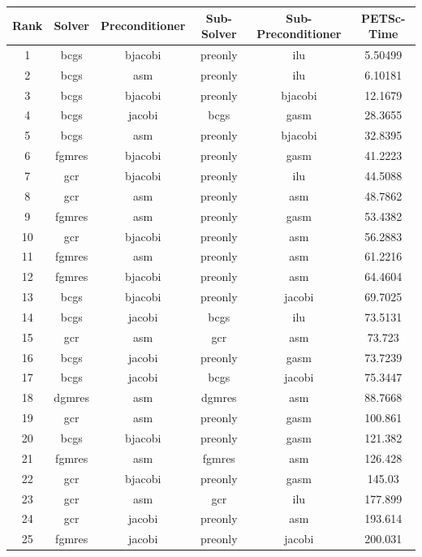 \begin{table}[h]
  \tiny
  \centering
  \begin{tabular}{cccccc}
    \hline Rank & Solver & Preconditioner & Sub-Solver & Sub-Preconditioner & PETSc-Time\\ \hline

    1 & bcgs & bjacobi & preonly & ilu & 5.50499 \\
    2 & bcgs & asm & preonly & ilu & 6.10181 \\
    3 & bcgs & bjacobi & preonly & bjacobi & 12.1679 \\
    4 & bcgs & jacobi & bcgs & gasm & 28.3655 \\
    5 & bcgs & asm & preonly & bjacobi & 32.8395 \\
    6 & fgmres & bjacobi & preonly & gasm & 41.2223 \\
    7 & gcr & bjacobi & preonly & ilu & 44.5088 \\
    8 & gcr & asm & preonly & asm & 48.7862 \\
    9 & fgmres & asm & preonly & gasm & 53.4382 \\
    10 & gcr & bjacobi & preonly & asm & 56.2883 \\
    11 & fgmres & asm & preonly & asm & 61.2216 \\
    12 & fgmres & bjacobi & preonly & asm & 64.4604 \\
    13 & bcgs & bjacobi & preonly & jacobi & 69.7025 \\
    14 & bcgs & jacobi & bcgs & ilu & 73.5131 \\
    15 & gcr & asm & gcr & asm & 73.723 \\
    16 & bcgs & jacobi & preonly & gasm & 73.7239 \\
    17 & bcgs & jacobi & bcgs & jacobi & 75.3447 \\
    18 & dgmres & asm & dgmres & asm & 88.7668 \\
    19 & gcr & asm & preonly & gasm & 100.861 \\
    20 & bcgs & bjacobi & preonly & gasm & 121.382 \\
    21 & fgmres & asm & fgmres & asm & 126.428 \\
    22 & gcr & bjacobi & preonly & gasm & 145.03 \\
    23 & gcr & asm & gcr & ilu & 177.899 \\
    24 & gcr & jacobi & preonly & asm & 193.614 \\
    25 & fgmres & jacobi & preonly & jacobi & 200.031 \\

\end{tabular}
\end{table}
